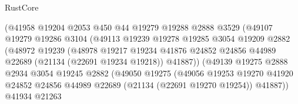\begin{lexlean}{RustCore}
\begin{coremodule}
                                  (@41958
                                    @19204
                                    @2053
                                    @450
                                    @44
                                    @19279
                                    @19288
                                    @2888
                                    @3529
                                    (@49107
                                      @19279
                                      @19286
                                      @3104
                                      (@49113
                                        @19239
                                        @19278
                                        @19285
                                        @3054
                                        @19209
                                        @2882
                                        (@48972
                                          @19239
                                          (@48978
                                            @19217
                                            @19234
                                            @41876
                                            @24852
                                            @24856
                                            @44989
                                            @22689
                                            (@21134 (@22691 @19234 @19218))
                                            @41887))
                                        (@49139
                                          @19275
                                          @2888
                                          @2934
                                          @3054
                                          @19245
                                          @2882
                                          (@49050
                                            @19275
                                            (@49056
                                              @19253
                                              @19270
                                              @41920
                                              @24852
                                              @24856
                                              @44989
                                              @22689
                                              (@21134 (@22691 @19270 @19254))
                                              @41887))
                                          @41934
                                          @21263

\end{coremodule}
\end{lexlean}
